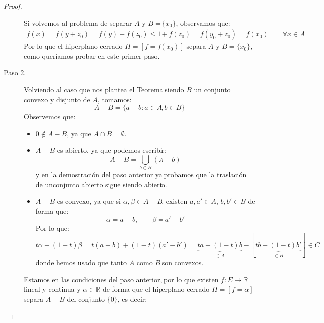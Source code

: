 \begin{teo}
\begin{proof}
\begin{description}
                \noindent
                Si volvemos al problema de separar $A$ y $B=\{x_0\}$, observamos que:
                \begin{align*}
                    f(x) = f(y+z_0) = f(y) + f(z_0) \leq 1 + f(z_0) = f(y_0 + z_0) = f(x_0) \qquad \forall x\in A
                \end{align*}
                Por lo que el hiperplano cerrado $H=[f=f(x_0)]$ separa $A$ y $B=\{x_0\}$, como queríamos probar en este primer paso.
            \item [Paso 2.] Volviendo al caso que nos plantea el Teorema siendo $B$ un conjunto convexo y disjunto de $A$, tomamos:
                \begin{equation*}
                    A - B = \{a-b : a\in A, b\in B\}
                \end{equation*}
                Observemos que:
                \begin{itemize}
                    \item $0\notin A-B$, ya que $A\cap B = \emptyset $.
                    \item $A-B$ es abierto, ya que podemos escribir:
                        \begin{equation*}
                            A-B = \bigcup_{b\in B}(A-b)
                        \end{equation*}
                        y en la demostración del paso anterior ya probamos que la traslación de unconjunto abierto sigue siendo abierto.
                    \item $A-B$ es convexo, ya que si $\alpha,\beta\in A-B$, existen $a,a'\in A$, $b,b'\in B$ de forma que:
                        \begin{equation*}
                            \alpha = a-b, \qquad \beta = a'-b'
                        \end{equation*}
                        Por lo que:
                        \begin{equation*}
                            t\alpha + (1-t)\beta = t(a-b) + (1-t)(a'-b') = \underbrace{ta + (1-t)b}_{\in A} - [\underbrace{tb + (1-t)b'}_{\in B}] \in C
                        \end{equation*}
                        donde hemos usado que tanto $A$ como $B$ son convexos.
                \end{itemize}
                Estamos en las condiciones del paso anterior, por lo que existen $f:E\to \mathbb{R}$ lineal y continua y $\alpha\in \mathbb{R}$ de forma que el hiperplano cerrado $H=[f=\alpha]$ separa $A-B$ del conjunto $\{0\}$, es decir:

\end{description}
\end{proof}
\end{teo}
